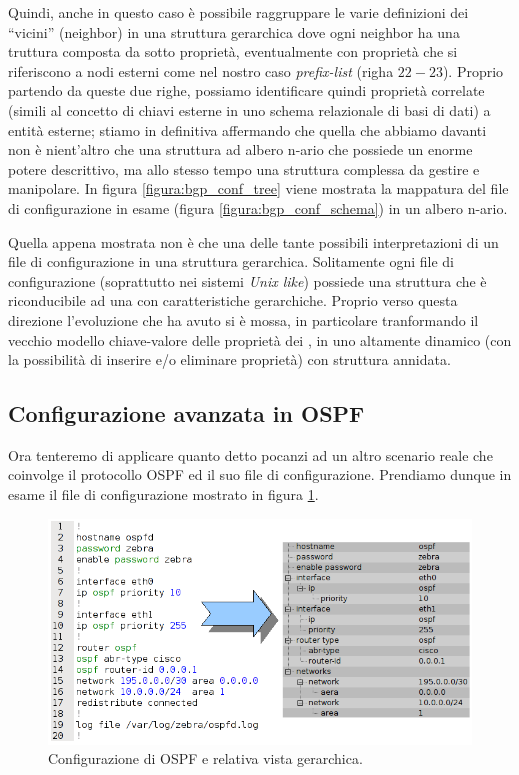 Quindi, anche in questo caso è possibile raggruppare le varie definizioni dei ``vicini'' (neighbor) in una struttura gerarchica dove ogni neighbor ha una truttura composta da sotto proprietà, eventualmente con proprietà che si riferiscono a nodi esterni come nel nostro caso \emph{prefix-list} (righa $22-23$). Proprio partendo da queste due righe, possiamo identificare quindi proprietà correlate (simili al concetto di chiavi esterne in uno schema relazionale di basi di dati) a entità esterne; stiamo in definitiva affermando che quella che abbiamo davanti non è nient'altro che una struttura ad albero n-ario che possiede un enorme potere descrittivo, ma allo stesso tempo una struttura complessa da gestire e manipolare. In figura \ref{figura:bgp_conf_tree} viene mostrata la mappatura del file di configurazione in esame (figura \ref{figura:bgp_conf_schema}) in un albero n-ario.

Quella appena mostrata non è che una delle tante possibili interpretazioni di un file di configurazione in una struttura gerarchica. Solitamente ogni file di configurazione (soprattutto nei sistemi \emph{Unix like}) possiede una struttura che è riconducibile ad una con caratteristiche gerarchiche. Proprio verso questa direzione l'evoluzione che \visualnetkit{} ha avuto si è mossa, in particolare tranformando il vecchio modello chiave-valore delle proprietà dei \plugin{}, in uno altamente dinamico (con la possibilità di inserire e/o eliminare proprietà) con struttura annidata.

\subsection{Configurazione avanzata in OSPF}
Ora tenteremo di applicare quanto detto pocanzi ad un altro scenario reale che coinvolge il protocollo OSPF ed il suo file di configurazione. Prendiamo dunque in esame il file di configurazione mostrato in figura \ref{figura:ospf_conf}.

\begin{figure}[!htb]
	\centering
	\includegraphics[width=12cm]{images/ospf_conf_schema_tree.png}
	\caption{Configurazione di OSPF e relativa vista gerarchica.}
	\label{figura:ospf_conf}
\end{figure}

